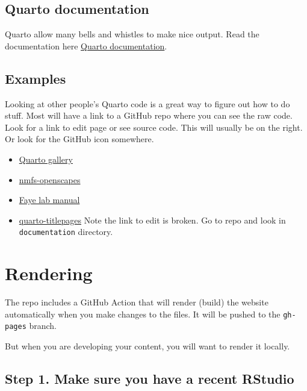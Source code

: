 \documentclass[
  letterpaper,
  oneside,
  open=any]{scrbook}
\providecommand{\tightlist}{%
  \setlength{\itemsep}{0pt}\setlength{\parskip}{0pt}}\usepackage{longtable,booktabs,array}
\begin{document}
\section{Quarto documentation}\label{quarto-documentation}

Quarto allow many bells and whistles to make nice output. Read the
documentation here \href{https://quarto.org/docs/guide/}{Quarto
documentation}.

\section{Examples}\label{examples}

Looking at other people's Quarto code is a great way to figure out how
to do stuff. Most will have a link to a GitHub repo where you can see
the raw code. Look for a link to edit page or see source code. This will
usually be on the right. Or look for the GitHub icon somewhere.

\begin{itemize}
\tightlist
\item
  \href{https://quarto.org/docs/gallery/}{Quarto gallery}
\item
  \href{https://nmfs-openscapes.github.io/}{nmfs-openscapes}
\item
  \href{https://thefaylab.github.io/lab-manual/}{Faye lab manual}
\item
  \href{https://nmfs-opensci.github.io/quarto_titlepages/}{quarto-titlepages}
  Note the link to edit is broken. Go to repo and look in
  \texttt{documentation} directory.
\end{itemize}


\chapter{Rendering}\label{rendering}

The repo includes a GitHub Action that will render (build) the website
automatically when you make changes to the files. It will be pushed to
the \texttt{gh-pages} branch.

But when you are developing your content, you will want to render it
locally.

\section{Step 1. Make sure you have a recent
RStudio}\label{step-1.-make-sure-you-have-a-recent-rstudio}
\end{document}
